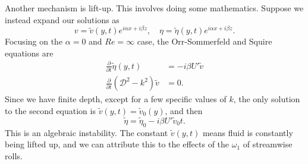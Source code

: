 \documentclass[a4paper]{article}
\begin{document}
Another mechanism is lift-up. This involves doing some mathematics. Suppose we instead expand our solutions as
\[
  v = \tilde{v}(y, t) e^{i\alpha x + i \beta z},\quad \eta = \tilde{\eta}(y, t) e^{i\alpha x + i \beta z}.
\]
Focusing on the $\alpha = 0$ and $Re = \infty$ case, the Orr-Sommerfeld and Squire equations are
\begin{align*}
  \frac{\partial}{\partial t} \tilde{\eta}(y, t) &= -i\beta U' \tilde{v}\\
  \frac{\partial}{\partial t} (\mathcal{D}^2 - k^2) \tilde{v} &= 0.
\end{align*}
Since we have finite depth, except for a few specific values of $k$, the only solution to the second equation is $\tilde{v}(y, t) = \tilde{v}_0(y)$, and then
\[
  \tilde{\eta} = \tilde{\eta}_0 - i \beta U' \tilde{v}_0 t.
\]
This is an algebraic instability. The constant $\tilde{v}(y, t)$ means fluid is constantly being lifted up, and we can attribute this to the effects of the $\omega_1$ of streamwise rolls.

\end{document}
